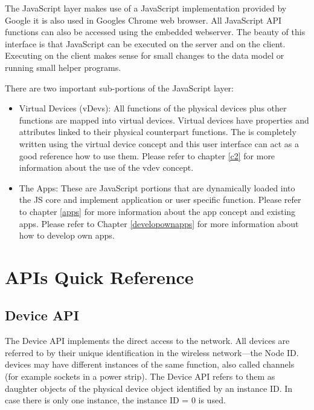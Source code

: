 The JavaScript layer makes use of a JavaScript implementation provided by Google it 
is also used in Googles Chrome web browser. All JavaScript API functions can also be 
accessed using the embedded webserver. The beauty of this interface is that JavaScript 
can be executed on the server and on the client. Executing on the client makes sense 
for small changes to the data model or running small helper programs.

There are two important sub-portions of the JavaScript layer:

\begin{itemize}

\item Virtual Devices (vDevs): All functions of the physical devices plus other functions are 
mapped into virtual devices. Virtual devices have properties and attributes linked to 
their physical counterpart functions. The \zwshui is completely 
written using the virtual device concept and this user interface can act as a good reference 
how to use them. Please refer to chapter \ref{c2} for more information about the 
use of the vdev concept.

\item The Apps: These are JavaScript portions that are dynamically loaded into the JS 
core and implement application or user specific function. Please refer to chapter \ref{apps} 
for more information about the app concept and existing apps. Please refer to Chapter 
\ref{developownapps} for more information about how to develop own apps.

\end{itemize}

\section{\zway APIs Quick Reference}

\subsection{\zwave Device API}
\label{zwavedeviceapi}

The \zwave Device API implements the direct access to the \zwave network. All \zwave devices 
are referred to by their unique identification in the wireless network---the Node ID. 
\zwave devices may have different instances of the same function, also called channels 
(for example sockets in a power strip). The \zwave Device API refers to them as daughter 
objects of the physical device object identified by an instance ID. In case there is 
only one instance, the instance ID = 0 is used.

